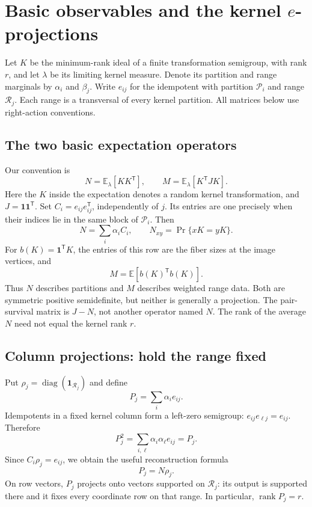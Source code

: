 \section{Basic observables and the kernel $e$-projections}
\label{eproj:section}
Let $K$ be the minimum-rank ideal of a finite transformation semigroup,
with rank $r$, and let $\lambda$ be its limiting kernel measure. Denote
its partition and range marginals by $\alpha_i$ and $\beta_j$. Write
$e_{ij}$ for the idempotent with partition $\mathcal P_i$ and range
$\mathcal R_j$. Each range is a transversal of every kernel partition.
All matrices below use right-action conventions.

\subsection{The two basic expectation operators}
Our convention is
\[
 \boxed{N=\mathbb E_\lambda[KK^{\mathsf T}],\qquad
 M=\mathbb E_\lambda[K^{\mathsf T}JK].}
\]
Here the $K$ inside the expectation denotes a random kernel transformation,
and $J=\mathbf1\mathbf1^{\mathsf T}$.
Set $C_i=e_{ij}e_{ij}^{\mathsf T}$, independently of $j$. Its entries are
one precisely when their indices lie in the same block of $\mathcal P_i$.
Then
\[
 N=\sum_i\alpha_i C_i,\qquad N_{xy}=\Pr\{xK=yK\}.
\]
For $b(K)=\mathbf1^{\mathsf T}K$, the entries of this row are the fiber
sizes at the image vertices, and
\[
 M=\mathbb E[b(K)^{\mathsf T}b(K)].
\]
Thus $N$ describes partitions and $M$ describes weighted range data.
Both are symmetric positive semidefinite, but neither is generally a
projection. The pair-survival matrix is $J-N$, not another operator
named $N$. The rank of the average $N$ need not equal the kernel rank $r$.

\subsection{Column projections: hold the range fixed}
Put $\rho_j=\operatorname{diag}(\mathbf1_{\mathcal R_j})$ and define
\[
 P_j=\sum_i\alpha_i e_{ij}.
\]
Idempotents in a fixed kernel column form a left-zero semigroup:
$e_{ij}e_{\ell j}=e_{ij}$. Therefore
\[
 P_j^2=\sum_{i,\ell}\alpha_i\alpha_\ell e_{ij}=P_j.
\]
Since $C_i\rho_j=e_{ij}$, we obtain the useful reconstruction formula
\[
 \boxed{P_j=N\rho_j.}
\]
On row vectors, $P_j$ projects onto vectors supported on $\mathcal R_j$:
its output is supported there and it fixes every coordinate row on that
range. In particular, $\operatorname{rank}P_j=r$.

